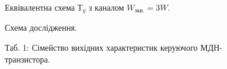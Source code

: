 \documentclass[a4paper,14pt]{extreport}
\begin{document}
\newpage

\begin{figure}[h]
\caption{Еквівалентна схема $Т_y$ з каналом $W_{\text{экв.}}=3W$.}
\label{ris1}
\end{figure}

\begin{figure}[h]
\caption{Схема дослідження.}
\label{ris2}
\end{figure}




\newpage
\begin{figure}[h]
Таб. 1: Сімейство вихідних характеристик керуючого МДН-транзистора.
\label{ris2}
\end{figure}
\end{document}
